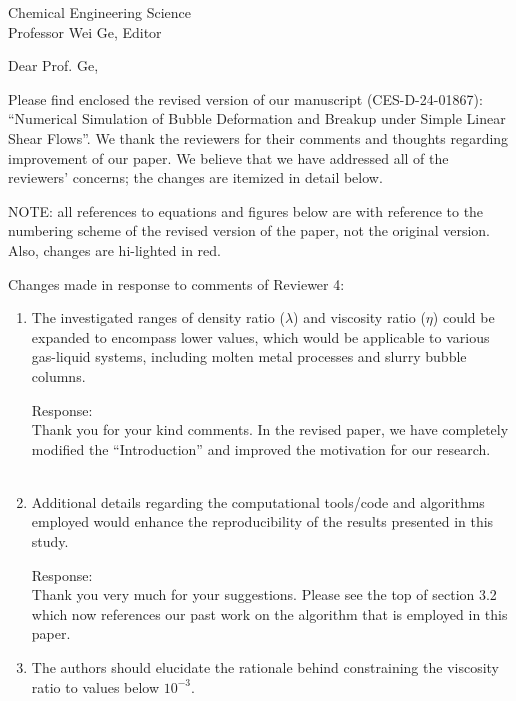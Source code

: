 \documentclass{letter}
\date{\today}
\begin{document}
\begin{letter}{
Chemical Engineering Science\\
Professor Wei Ge, Editor\\}

\opening{Dear Prof. Ge,}

Please find enclosed the revised version of our manuscript (CES-D-24-01867):
``Numerical Simulation of Bubble Deformation and Breakup under 
Simple Linear Shear Flows''.
We thank the reviewers for their comments and thoughts regarding improvement 
of our paper. We believe that we have addressed all of the reviewers’ 
concerns; the changes are itemized in detail below.


\par\noindent
NOTE: all references to equations and figures below are with
reference to the numbering scheme of the revised version of the paper,
not the original version.  Also, changes are hi-lighted in red.
\par\noindent

Changes made in response to comments of Reviewer 4: 
\begin{enumerate}
\item
\textsf
{The investigated ranges of density ratio ($\lambda$) and viscosity ratio ($\eta$) could be expanded to encompass lower values, which 
would be applicable to various gas-liquid systems, including molten metal processes and slurry bubble columns.}
\vspace{3 mm}

Response: \\
Thank you for your kind comments.  In the revised paper, we have completely modified the ``Introduction'' and improved the motivation for our research.\\
\\

\par\noindent
\item
\textsf
{Additional details regarding the computational tools/code and algorithms employed would enhance the reproducibility of the 
results presented in this study.}
\vspace{3 mm}

Response: \\
Thank you very much for your suggestions.  Please see the top of section 3.2 which now references our past work on the algorithm that is employed in this paper.
\\

\par\noindent
\item
\textsf
{The authors should elucidate the rationale behind constraining the viscosity ratio to values below $10^{-3}$.}
\vspace{3 mm}


\end{enumerate}
\end{letter}
\end{document}

